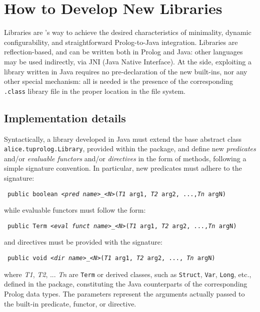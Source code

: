 \chapter{How to Develop New Libraries}
\label{ch:howto-develop-libraries}

Libraries are \tuprolog{}'s way to achieve the desired characteristics
of minimality, dynamic configurability, and straightforward
Prolog-to-Java integration.
%
Libraries are reflection-based, and can be written both in Prolog
and Java: other languages may be used indirectly, via JNI (Java
Native Interface).
%
At the \tuprolog{} side, exploiting a library written in Java
requires no pre-declaration of the new built-ins, nor any other
special mechanism: all is needed is the presence of the
corresponding \texttt{.class} library file in the proper location
in the file system.

\section{Implementation details}

Syntactically, a library developed in Java must extend the base
abstract class \texttt{alice.tuprolog.Library}, provided within
the \tuprolog{} package, and define new \textit{predicates} and/or
\textit{evaluable functors} and/or \textit{directives} in the form
of methods, following a simple signature convention.
%
In particular, new predicates must adhere to the signature:
%
\begin{center}
\small\tt
    public boolean <\textit{pred name}>\_<\textit{N}>(\textit{T1} arg1,
\textit{T2} arg2, ...,\textit{Tn} argN)
\end{center}
%
while evaluable functors must follow the form:
%
\begin{center}
    \small\tt
    public Term <\textit{eval funct name}>\_<\textit{N}>(\textit{T1} arg1,
\textit{T2} arg2, ...,\textit{Tn} argN)
\end{center}
%
and directives must be provided with the signature:
%
\begin{center}
    \small\tt
    public void <\textit{dir name}>\_<\textit{N}>(\textit{T1} arg1,
\textit{T2} arg2, ..., \textit{Tn} argN)
\end{center}
%
where \textit{T1}, \textit{T2}, ... \textit{Tn} are \texttt{Term} or derived
classes, such as \texttt{Struct}, \texttt{Var}, \texttt{Long}, etc., defined in
the \tuprolog{} package, constituting  the Java counterparts of
the corresponding Prolog data types.
%
The parameters represent the arguments actually passed to the built-in
predicate, functor, or directive.

